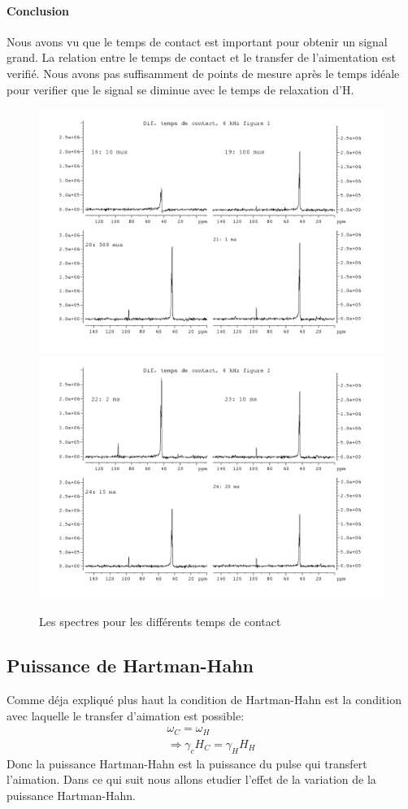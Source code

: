 \documentclass[a4paper,12pt]{scrartcl}
\begin{document}
   \paragraph{Conclusion}
    Nous avons vu que le temps de contact est important pour obtenir un signal grand. La relation entre le temps de contact et le transfer de l'aimentation est verifié. Nous avons pas suffisamment de points de mesure après le temps idéale pour verifier que le signal se diminue avec le temps de relaxation d'H.
\begin{figure}
    \includegraphics[width=\textwidth]{bilder/figure3.png}
    \includegraphics[width=\textwidth]{bilder/figure4.png}
    \caption{\label{temps} Les spectres pour les différents temps de contact}
   \end{figure}
  \subsection{Puissance de Hartman-Hahn}
 Comme déja expliqué plus haut la condition de Hartman-Hahn est la condition avec laquelle le transfer d'aimation est possible:
    \begin{eqnarray*}
     \omega_C=\omega_H\\
     \Rightarrow \gamma_c H_C=\gamma_H H_H
    \end{eqnarray*}
 Donc la puissance Hartman-Hahn est la puissance du pulse qui transfert l'aimation. Dans ce qui suit nous allons etudier l'effet de la variation de la puissance Hartman-Hahn.
\end{document}
